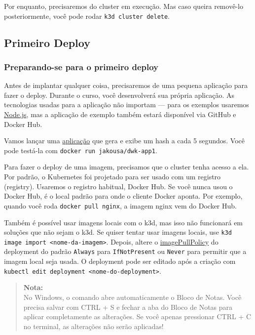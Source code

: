 \documentclass[12pt,a4paper]{article}
\begin{document}
Por enquanto, precisaremos do cluster em execução. Mas caso queira removê-lo posteriormente, você pode rodar \texttt{k3d cluster delete}.

\subsection{Primeiro Deploy}
\label{sec:deploy}

\subsubsection{Preparando-se para o primeiro deploy}
\label{sec:prep_deploy}

Antes de implantar qualquer coisa, precisaremos de uma pequena aplicação para fazer o deploy. Durante o curso, você desenvolverá sua própria aplicação. As tecnologias usadas para a aplicação não importam — para os exemplos usaremos \href{https://nodejs.org/en/}{Node.js}, mas a aplicação de exemplo também estará disponível via GitHub e Docker Hub.

Vamos lançar uma \href{https://github.com/kubernetes-hy/material-example/tree/master/app1}{aplicação} que gera e exibe um hash a cada 5 segundos.
Você pode testá-la com \texttt{docker run jakousa/dwk-app1}.

Para fazer o deploy de uma imagem, precisamos que o cluster tenha acesso a ela. Por padrão, o Kubernetes foi projetado para ser usado com um registro (registry). Usaremos o registro habitual, Docker Hub. Se você nunca usou o Docker Hub, é o local padrão para onde o cliente Docker aponta. Por exemplo, quando você roda \texttt{docker pull nginx}, a imagem nginx vem do Docker Hub.

Também é possível usar imagens locais com o k3d, mas isso não funcionará em soluções que não sejam o k3d. Se quiser tentar usar imagens locais, use \texttt{k3d image import <nome-da-imagem>}. Depois, altere o \href{https://kubernetes.io/docs/concepts/containers/images/\#image-pull-policy}{imagePullPolicy} do deployment do padrão \texttt{Always} para \texttt{IfNotPresent} ou \texttt{Never} para permitir que a imagem local seja usada. O deployment pode ser editado após a criação com \texttt{kubectl edit deployment <nome-do-deployment>}.

\begin{quote}
\textbf{Nota:} \\
No Windows, o comando abre automaticamente o Bloco de Notas. Você precisa salvar com CTRL + S e fechar a aba do Bloco de Notas para aplicar completamente as alterações. Se você apenas pressionar CTRL + C no terminal, as alterações não serão aplicadas!
\end{quote}
\end{document}
